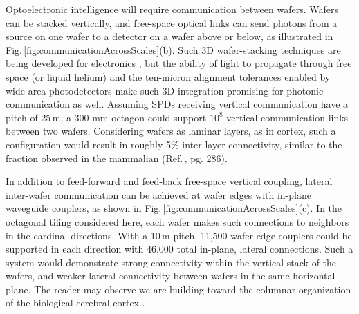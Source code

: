 \documentclass[twocolumn]{article}
\begin{document}
\begin{figure} 
\end{figure}
Optoelectronic intelligence will require communication between wafers. Wafers can be stacked vertically, and free-space optical links can send photons from a source on one wafer to a detector on a wafer above or below, as illustrated in Fig.\,\ref{fig:communicationAcrossScales}(b). Such 3D wafer-stacking techniques are being developed for electronics \cite{shhi2017,sani2018}, but the ability of light to propagate through free space (or liquid helium) and the ten-micron alignment tolerances enabled by wide-area photodetectors make such 3D integration promising for photonic communication as well. Assuming SPDs receiving vertical communication have a pitch of 25\,\textmu m, a 300-mm octagon could support $10^8$ vertical communication links between two wafers. Considering wafers as laminar layers, as in cortex, such a configuration would result in roughly 5\% inter-layer connectivity, similar to the fraction observed in the mammalian (Ref.\,\cite{bu2006}, pg. 286).

In addition to feed-forward and feed-back free-space vertical coupling, lateral inter-wafer communication can be achieved at wafer edges with in-plane waveguide couplers, as shown in Fig.\,\ref{fig:communicationAcrossScales}(c). In the octagonal tiling considered here, each wafer makes such connections to neighbors in the cardinal directions. With a 10\,\textmu m pitch, 11,500 wafer-edge couplers could be supported in each direction with 46,000 total in-plane, lateral connections. Such a system would demonstrate strong connectivity within the vertical stack of the wafers, and weaker lateral connectivity between wafers in the same horizontal plane. The reader may observe we are building toward the columnar organization of the biological cerebral cortex \cite{mo1997}.
\end{document}
